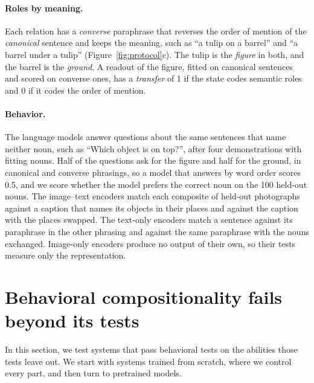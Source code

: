 \documentclass[10pt]{article}
\theoremstyle{plain}
\theoremstyle{remark}
\begin{document}
\paragraph{Roles by meaning.} Each relation has a \emph{converse} paraphrase that reverses the order of mention of the \emph{canonical} sentence and keeps the meaning, such as ``a tulip on a barrel'' and ``a barrel under a tulip'' (Figure~\ref{fig:protocol}c). The tulip is the \emph{figure} in both, and the barrel is the \emph{ground}. A readout of the figure, fitted on canonical sentences and scored on converse ones, has a \emph{transfer} of 1 if the state codes semantic roles and 0 if it codes the order of mention.

\paragraph{Behavior.} The language models answer questions about the same sentences that name neither noun, such as ``Which object is on top?'', after four demonstrations with fitting nouns. Half of the questions ask for the figure and half for the ground, in canonical and converse phrasings, so a model that answers by word order scores 0.5, and we score whether the model prefers the correct noun on the 100 held-out nouns. The image--text encoders match each composite of held-out photographs against a caption that names its objects in their places and against the caption with the places swapped. The text-only encoders match a sentence against its paraphrase in the other phrasing and against the same paraphrase with the nouns exchanged. Image-only encoders produce no output of their own, so their tests measure only the representation.

\section{Behavioral compositionality fails beyond its tests}
\label{sec:results}

In this section, we test systems that pass behavioral tests on the abilities those tests leave out. We start with systems trained from scratch, where we control every part, and then turn to pretrained models.
\end{document}
